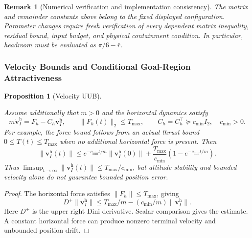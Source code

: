 \documentclass[12pt, a4paper]{article}
\newtheorem{proposition}{Proposition}
\newtheorem{remark}{Remark}
\begin{document}
\begin{remark}[Numerical verification and implementation consistency]
The matrix and remainder constants above belong to the fixed displayed
configuration. Parameter changes require fresh verification of every
dependent matrix inequality, residual bound, input budget, and physical
containment condition. In particular, headroom must be evaluated as
$\pi/6-\bar r$.
\end{remark}

\subsubsection{Velocity Bounds and Conditional Goal-Region Attractiveness}
\label{sec:translation}

\begin{proposition}[Velocity UUB]
\label{prop:trans}

Assume additionally that $m>0$ and the horizontal dynamics satisfy
\[
 m\dot{\mathbf v}_I^{\mathrm h}=F_h-C_h\mathbf v_I^{\mathrm h},\qquad
 \|F_h(t)\|_2\le T_{\max},\qquad
 C_h=C_h^\top\succeq c_{\min}I_2,\quad c_{\min}>0.
\]
For example, the force bound follows from an actual thrust bound
$0\le T(t)\le T_{\max}$ when no additional horizontal force is present.
Then
\[
 \|\mathbf v_I^{\mathrm h}(t)\|
 \le e^{-c_{\min}t/m}\|\mathbf v_I^{\mathrm h}(0)\|
 +\frac{T_{\max}}{c_{\min}}(1-e^{-c_{\min}t/m}).
\]
Thus $\limsup_{t\to\infty}\|\mathbf v_I^{\mathrm h}(t)\|
\le T_{\max}/c_{\min}$, but attitude stability and bounded velocity
alone do not guarantee bounded position error.
\end{proposition}
\begin{proof}
The horizontal force satisfies $\|F_h\|\le T_{\max}$, giving
\[
 D^+\|\mathbf v_I^{\mathrm h}\|
 \le T_{\max}/m-(c_{\min}/m)\|\mathbf v_I^{\mathrm h}\|.
\]
Here $D^+$ is the upper right Dini derivative. Scalar comparison gives the
estimate. A constant horizontal force can produce nonzero terminal velocity
and unbounded position drift.
\end{proof}
\end{document}
